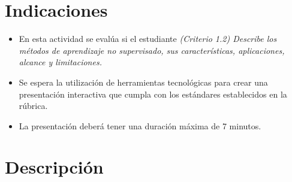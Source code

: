 \documentclass[a4,11pt]{aleph-notas}
\begin{document}
\encabezado

\section{Indicaciones}

\begin{itemize}[leftmargin=*]
\item En esta actividad se evalúa si el estudiante \textit{(Criterio 1.2) Describe los métodos de aprendizaje no supervisado, sus características, aplicaciones, alcance y limitaciones.}
\item Se espera la utilización de herramientas tecnológicas para crear una presentación interactiva que cumpla con los estándares establecidos en la rúbrica.
\item La presentación deberá tener una duración máxima de 7 minutos.
\end{itemize}

\section{Descripción}
\end{document}
